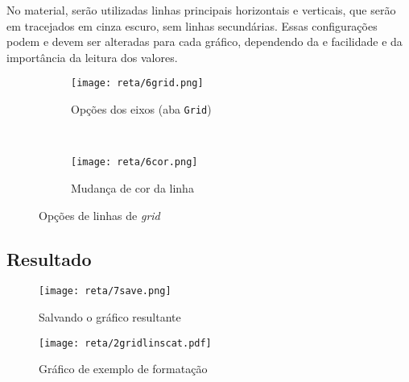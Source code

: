     No material, serão utilizadas linhas principais horizontais e verticais, que serão em tracejados em cinza escuro, sem linhas secundárias. Essas configurações podem e devem ser alteradas para cada gráfico, dependendo da e facilidade e da importância da leitura dos valores.

    \begin{figure}[htbp]
        \centering
        \begin{subfigure}{0.45\textwidth}
            \centering
            \texttt{[image: reta/6grid.png]}

            \caption{Opções dos eixos (aba \texttt{Grid})}
            \label{fig:reta:grid}
        \end{subfigure}
        ~
        \begin{subfigure}{0.45\textwidth}
            \centering
            \texttt{[image: reta/6cor.png]}

            \caption{Mudança de cor da linha}
            \label{fig:reta:gridcor}
        \end{subfigure}
        \caption{Opções de linhas de \textit{grid}}
        \label{fig:reta:opcoes_eixo}
    \end{figure}


\subsection{Resultado}

    \begin{figure}[htbp]
        \centering
        \texttt{[image: reta/7save.png]}

        \caption{Salvando o gráfico resultante}
        \label{fig:reta:salvar}
    \end{figure}

    \begin{figure}[H]
        \centering
        \texttt{[image: reta/2gridlinscat.pdf]}

        \caption{Gráfico de exemplo de formatação}
        \label{fig:reta:gridlinscat}
    \end{figure}

